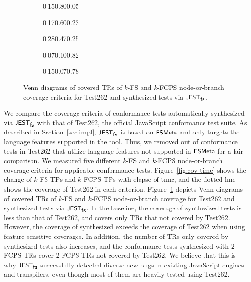 
\begin{figure}
  \centering
  \begin{subfigure}{0.19\textwidth}
    {0.15}{0.80}{0.05}
  \end{subfigure}
  \begin{subfigure}{0.19\textwidth}
    {0.17}{0.60}{0.23}
  \end{subfigure}
  \begin{subfigure}{0.19\textwidth}
    {0.28}{0.47}{0.25}
  \end{subfigure}
  \begin{subfigure}{0.19\textwidth}
    {0.07}{0.10}{0.82}
  \end{subfigure}
  \begin{subfigure}{0.19\textwidth}
    {0.15}{0.07}{0.78}
  \end{subfigure}
  \caption{
    Venn diagrams of covered TRs of $k$-FS and $k$-FCPS node-or-branch coverage
    criteria for Test262 and synthesized tests via $\textsf{\small JEST}_{\textsf{\small fs}}$.
  }
  \label{fig:venn-test262}
\end{figure}



We compare the coverage criteria of conformance tests automatically synthesized
via $\textsf{\small JEST}_{\textsf{\small fs}}$ with that of Test262, the official JavaScript conformance test
suite.
%
As described in Section~\ref{sec:impl}, $\textsf{\small JEST}_{\textsf{\small fs}}$ is based on $\textsf{\small ESMeta}$ and only
targets the language features supported in the tool.
%
Thus, we removed  out of  conformance tests in
Test262 that utilize language features not supported in $\textsf{\small ESMeta}$ for a fair
comparison.
%
We measured five different $k$-FS and $k$-FCPS node-or-branch coverage criteria
for  applicable conformance tests.
%
Figure~\ref{fig:cov-time} shows the change of $k$-FS-TPs and $k$-FCPS-TPs with
elapse of time, and the dotted line shows the coverage of Test262 in each
criterion.
%
Figure~\ref{fig:venn-test262} depicts Venn diagrams of covered TRs of $k$-FS and
$k$-FCPS node-or-branch coverage  for Test262 and synthesized tests via $\textsf{\small JEST}_{\textsf{\small fs}}$.
%
In the baseline, the coverage of synthesized tests is less than that of Test262,
and covers only  TRs that not covered by Test262.
%
However, the coverage of synthesized exceeds the coverage of Test262 when using
feature-sensitive coverages.
%
In addition, the number of TRs only covered by synthesized tests also increases,
and the conformance tests synthesized with $2$-FCPS-TRs cover 
2-FCPS-TRs not covered by Test262.
%
We believe that this is why $\textsf{\small JEST}_{\textsf{\small fs}}$ successfully detected diverse new bugs in
existing JavaScript engines and transpilers, even though most of them are
heavily tested using Test262.
